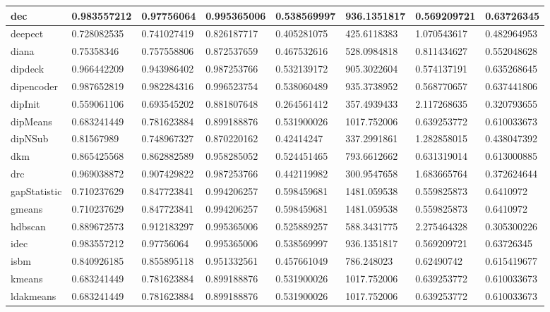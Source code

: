 \begin{table}[H]
\begin{tabular}{|l|l|l|l|l|l|l|l|}
\hline
dec & 0.983557212 & 0.97756064 & 0.995365006 & 0.538569997 & 936.1351817 & 0.569209721 & 0.63726345 \\
\hline
deepect & 0.728082535 & 0.741027419 & 0.826187717 & 0.405281075 & 425.6118383 & 1.070543617 & 0.482964953 \\
\hline
diana & 0.75358346 & 0.757558806 & 0.872537659 & 0.467532616 & 528.0984818 & 0.811434627 & 0.552048628 \\
\hline
dipdeck & 0.966442209 & 0.943986402 & 0.987253766 & 0.532139172 & 905.3022604 & 0.574137191 & 0.635268645 \\
\hline
dipencoder & 0.987652819 & 0.982284316 & 0.996523754 & 0.538060489 & 935.3738952 & 0.568770657 & 0.637441806 \\
\hline
dipInit & 0.559061106 & 0.693545202 & 0.881807648 & 0.264561412 & 357.4939433 & 2.117268635 & 0.320793655 \\
\hline
dipMeans & 0.683241449 & 0.781623884 & 0.899188876 & 0.531900026 & 1017.752006 & 0.639253772 & 0.610033673 \\
\hline
dipNSub & 0.81567989 & 0.748967327 & 0.870220162 & 0.42414247 & 337.2991861 & 1.282858015 & 0.438047392 \\
\hline
dkm & 0.865425568 & 0.862882589 & 0.958285052 & 0.524451465 & 793.6612662 & 0.631319014 & 0.613000885 \\
\hline
drc & 0.969038872 & 0.907429822 & 0.987253766 & 0.442119982 & 300.9547658 & 1.683665764 & 0.372624644 \\
\hline
gapStatistic & 0.710237629 & 0.847723841 & 0.994206257 & 0.598459681 & 1481.059538 & 0.559825873 & 0.6410972 \\
\hline
gmeans & 0.710237629 & 0.847723841 & 0.994206257 & 0.598459681 & 1481.059538 & 0.559825873 & 0.6410972 \\
\hline
hdbscan & 0.889672573 & 0.912183297 & 0.995365006 & 0.525889257 & 588.3431775 & 2.275464328 & 0.305300226 \\
\hline
idec & 0.983557212 & 0.97756064 & 0.995365006 & 0.538569997 & 936.1351817 & 0.569209721 & 0.63726345 \\
\hline
isbm & 0.840926185 & 0.855895118 & 0.951332561 & 0.457661049 & 786.248023 & 0.62490742 & 0.615419677 \\
\hline
kmeans & 0.683241449 & 0.781623884 & 0.899188876 & 0.531900026 & 1017.752006 & 0.639253772 & 0.610033673 \\
\hline
ldakmeans & 0.683241449 & 0.781623884 & 0.899188876 & 0.531900026 & 1017.752006 & 0.639253772 & 0.610033673 \\

\end{tabular}
\end{table}
